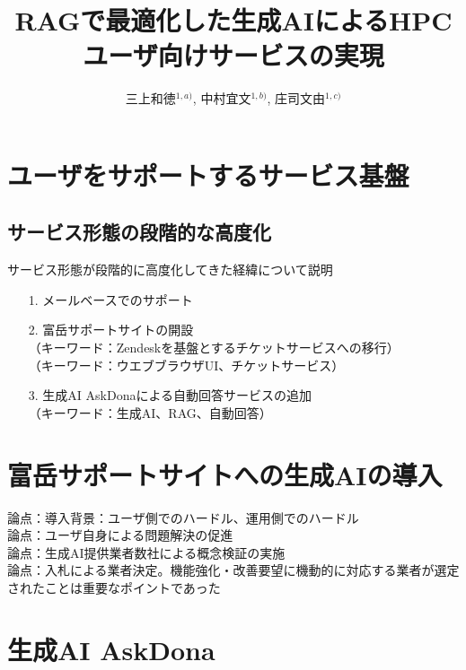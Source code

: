 \documentclass{jsaxiesproc}
\title{
	RAGで最適化した生成AIによるHPCユーザ向けサービスの実現
}
\author{
三上和徳$^{1,a)}$,
中村宜文$^{1,b)}$,
庄司文由$^{1,c)}$
}
\affiliation{
1) 理化学研究所 計算科学研究センター
}
\begin{document}
\maketitle

\section{ユーザをサポートするサービス基盤}

\subsection{サービス形態の段階的な高度化}
サービス形態が段階的に高度化してきた経緯について説明

\begin{itemize}
\item[1.] メールベースでのサポート
\item[2.] 富岳サポートサイトの開設\\
	（キーワード：Zendeskを基盤とするチケットサービスへの移行）\\
	（キーワード：ウエブブラウザUI、チケットサービス）
\item[3.] 生成AI AskDonaによる自動回答サービスの追加\\
	（キーワード：生成AI、RAG、自動回答）
\end{itemize}


\section{富岳サポートサイトへの生成AIの導入}

論点：導入背景：ユーザ側でのハードル、運用側でのハードル\\
論点：ユーザ自身による問題解決の促進\\
論点：生成AI提供業者数社による概念検証の実施\\
論点：入札による業者決定。機能強化・改善要望に機動的に対応する業者が選定されたことは重要なポイントであった\\


\section{生成AI AskDona}
\end{document}
